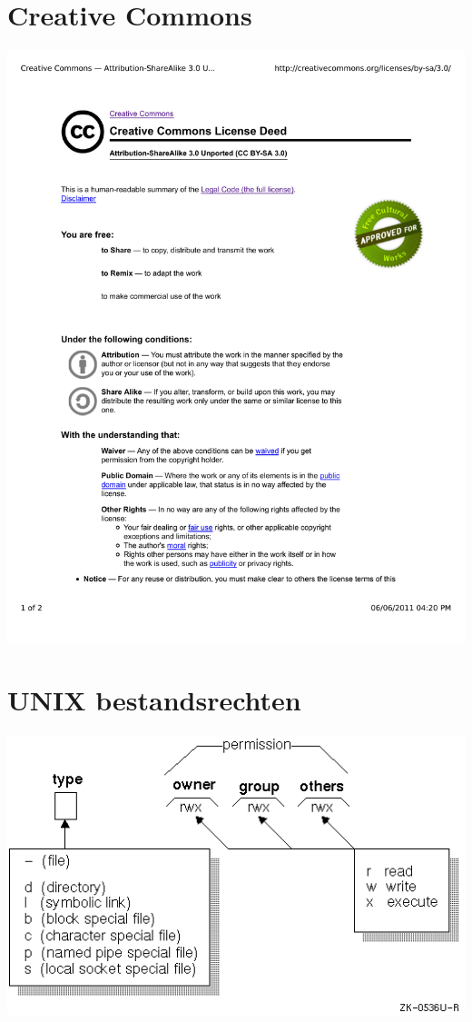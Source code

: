 \chapter{Creative Commons}
\includegraphics[scale=0.6]{src/cc-by-sa.pdf}

\chapter{UNIX bestandsrechten}
\includegraphics[scale=0.7]{src/unix_file_permissions.png}

